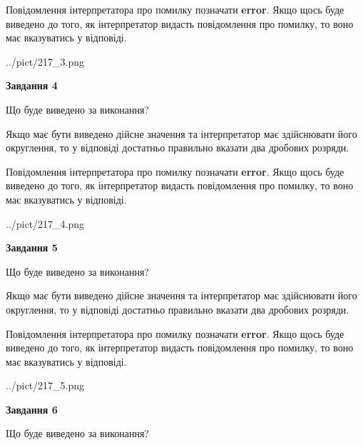 \documentclass[12pt, ukrainian]{article}
\begin{document}
{\begin {Large}
Повідомлення інтерпретатора про помилку позначати \textbf{error}.
Якщо щось буде виведено до того, як інтерпретатор видасть повідомлення про помилку, 
то воно має вказуватись у відповіді. \par

\begin{center}
	{../pict/217_3.png}
\end{center}
\newpage

{\begin {center}\textbf{Завдання 4}\end {center}}\par
Що буде виведено за виконання? \par

Якщо має бути виведено дійсне значення та інтерпретатор має здійснювати його округлення, 
то у відповіді достатньо правильно вказати два дробових розряди.

Повідомлення інтерпретатора про помилку позначати \textbf{error}.
Якщо щось буде виведено до того, як інтерпретатор видасть повідомлення про помилку, 
то воно має вказуватись у відповіді. \par

\begin{center}
	{../pict/217_4.png}
\end{center}
\newpage

{\begin {center}\textbf{Завдання 5}\end {center}}\par
Що буде виведено за виконання? \par

Якщо має бути виведено дійсне значення та інтерпретатор має здійснювати його округлення, 
то у відповіді достатньо правильно вказати два дробових розряди.

Повідомлення інтерпретатора про помилку позначати \textbf{error}.
Якщо щось буде виведено до того, як інтерпретатор видасть повідомлення про помилку, 
то воно має вказуватись у відповіді. \par

\begin{center}
	{../pict/217_5.png}
\end{center}
\newpage

{\begin {center}\textbf{Завдання 6}\end {center}}\par
Що буде виведено за виконання? \par


\end{Large}}
\end{document}
